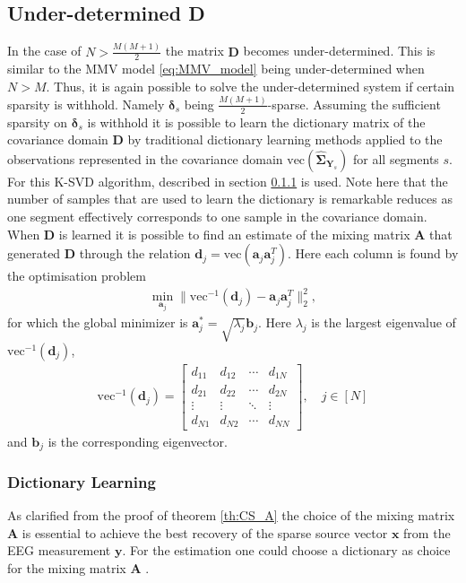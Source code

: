 \subsection{Under-determined \textbf{D}}
In the case of $N > \frac{M(M+1)}{2}$ the matrix $\textbf{D}$ becomes under-determined. 
This is similar to the MMV model \eqref{eq:MMV_model} being under-determined  when $N > M$. 
Thus, it is again possible to solve the under-determined system if certain sparsity is withhold. 
Namely $\boldsymbol{\delta}_s$ being $\frac{M(M+1)}{2}$-sparse.
Assuming the sufficient sparsity on $\boldsymbol{\delta}_s$ is withhold it is possible to learn the dictionary matrix of the covariance domain $\mathbf{D}$ by traditional dictionary learning methods applied to the observations represented in the covariance domain $\text{vec}(\widehat{\boldsymbol{\Sigma}}_{\mathbf{Y}_s})$ for all segments $s$.
For this K-SVD algorithm, described in section \ref{sec:dictionarylearning} is used. 
Note here that the number of samples that are used to learn the dictionary is remarkable reduces as one segment effectively corresponds to one sample in the covariance domain.  
When $\mathbf{D}$ is learned it is possible to find an estimate of the mixing matrix $\mathbf{A}$ that generated $\textbf{D}$ through the relation $\mathbf{d}_j = \text{vec}(\mathbf{a}_j \mathbf{a}_j^T)$. Here each column is found by the optimisation problem 
\begin{align*}
\min_{\textbf{a}_j} \| \text{vec}^{-1}(\textbf{d}_j) -\textbf{a}_j\textbf{a}_j^T\|_2^2, 
\end{align*}
for which the global minimizer is $\mathbf{a}^{\ast}_j=\sqrt{\lambda_j} \textbf{b}_j$. Here $\lambda_j$ is the largest eigenvalue of $\text{vec}^{-1}(\textbf{d}_j)$,
\begin{align*}
\text{vec}^{-1}(\textbf{d}_j) = 
\begin{bmatrix}
d_{11} & d_{12} & \cdots & d_{1N} \\
d_{21} & d_{22} & \cdots & d_{2N} \\
\vdots & \vdots & \ddots & \vdots \\
d_{N1} & d_{N2} & \cdots & d_{NN}
\end{bmatrix}, \quad j \in [N]
\end{align*}
and $\textbf{b}_j$ is the corresponding eigenvector.


\subsubsection{Dictionary Learning}\label{sec:dictionarylearning}
As clarified from the proof of theorem \ref{th:CS_A} the choice of the mixing matrix $\mathbf{A}$ is essential to achieve the best recovery of the sparse source vector $\mathbf{x}$ from the EEG measurement $\mathbf{y}$. 
For the estimation one could choose a dictionary as choice for the mixing matrix $\mathbf{A}$ .

